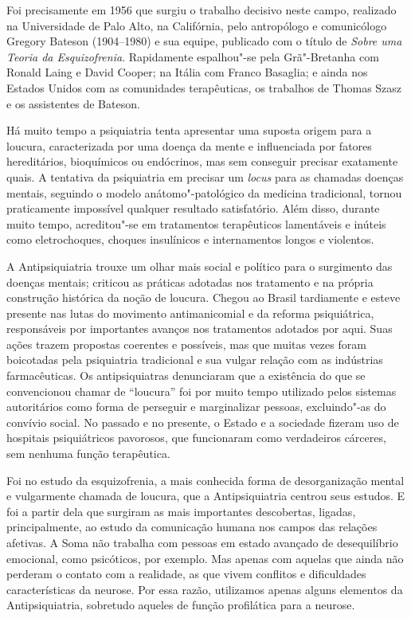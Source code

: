 Foi precisamente em 1956 que surgiu o trabalho decisivo neste campo,
realizado na Universidade de Palo Alto, na Califórnia, pelo antropólogo
e comunicólogo Gregory Bateson (1904--1980) e sua equipe, publicado com o
título de \emph{Sobre uma Teoria da Esquizofrenia}. Rapidamente
espalhou"-se pela Grã"-Bretanha com Ronald Laing e David Cooper; na
Itália com Franco Basaglia; e ainda nos Estados Unidos com as
comunidades terapêuticas, os trabalhos de Thomas Szasz e os assistentes
de Bateson.

Há muito tempo a psiquiatria tenta apresentar uma suposta origem para a
loucura, caracterizada por uma doença da mente e influenciada por
fatores hereditários, bioquímicos ou endócrinos, mas sem conseguir
precisar exatamente quais. A tentativa da psiquiatria em precisar um
\emph{locus} para as chamadas doenças mentais, seguindo o modelo
anátomo"-patológico da medicina tradicional, tornou praticamente
impossível qualquer resultado satisfatório. Além disso, durante muito
tempo, acreditou"-se em tratamentos terapêuticos lamentáveis e inúteis
como eletrochoques, choques insulínicos e internamentos longos e
violentos.

A Antipsiquiatria trouxe um olhar mais social e político para o
surgimento das doenças mentais; criticou as práticas adotadas nos
tratamento e na própria construção histórica da noção de loucura. Chegou
ao Brasil tardiamente e esteve presente nas lutas do movimento
antimanicomial e da reforma psiquiátrica, responsáveis por importantes
avanços nos tratamentos adotados por aqui. Suas ações trazem propostas
coerentes e possíveis, mas que muitas vezes foram boicotadas pela
psiquiatria tradicional e sua vulgar relação com as indústrias
farmacêuticas. Os antipsiquiatras denunciaram que a existência do que se
convencionou chamar de ``loucura'' foi por muito tempo utilizado pelos
sistemas autoritários como forma de perseguir e marginalizar pessoas,
excluindo"-as do convívio social. No passado e no presente, o Estado e a
sociedade fizeram uso de hospitais psiquiátricos pavorosos, que
funcionaram como verdadeiros cárceres, sem nenhuma função terapêutica.

Foi no estudo da esquizofrenia, a mais conhecida forma de desorganização
mental e vulgarmente chamada de loucura, que a Antipsiquiatria centrou
seus estudos. E foi a partir dela que surgiram as mais importantes
descobertas, ligadas, principalmente, ao estudo da comunicação humana
nos campos das relações afetivas. A Soma não trabalha com pessoas em
estado avançado de desequilíbrio emocional, como psicóticos, por
exemplo. Mas apenas com aquelas que ainda não perderam o contato com a
realidade, as que vivem conflitos e dificuldades características da
neurose. Por essa razão, utilizamos apenas alguns elementos da
Antipsiquiatria, sobretudo aqueles de função profilática para a neurose.

